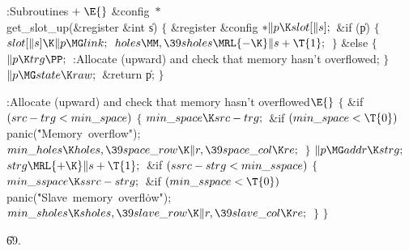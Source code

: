 \Y\B\4:Subroutines\X${}\mathrel+\E{}$\6
\&{config} ${}{*}{}$\\{get\_slot\_up}(\&{register} \&{int} \|s)\1\1\2\2\6
${}\{{}$\1\6
\&{register} \&{config} ${}{*}\|p\K\\{slot}[\|s];{}$\7
\&{if} (\|p)\5
${}\{{}$\1\6
${}\\{slot}[\|s]\K\|p\MG\\{link};{}$\6
${}\\{holes}\MM,\39\\{sholes}\MRL{-{\K}}\|s+\T{1};{}$\6
\4${}\}{}$\5
\2\&{else}\5
${}\{{}$\1\6
${}\|p\K\\{trg}\PP;{}$\6
:Allocate  (upward) and check that memory hasn't
overflowed\X;\6
\4${}\}{}$\2\6
${}\|p\MG\\{state}\K\\{raw};{}$\6
\&{return} \|p;\6
\4${}\}{}$\2\par
\fi

\B{}:Allocate  (upward) and check
that memory hasn't overflowed\X${}\E{}$\6
${}\{{}$\1\6
\&{if} ${}(\\{src}-\\{trg}<\\{min\_space}){}$\5
${}\{{}$\1\6
${}\\{min\_space}\K\\{src}-\\{trg};{}$\6
\&{if} ${}(\\{min\_space}<\T{0}){}$\1\5
\\{panic}(\.{"Memory\ overflow"});\2\6
${}\\{min\_holes}\K\\{holes},\39\\{space\_row}\K\|r,\39\\{space\_col}\K%
\\{re};{}$\6
\4${}\}{}$\2\6
${}\|p\MG\\{addr}\K\\{strg};{}$\6
${}\\{strg}\MRL{+{\K}}\|s+\T{1};{}$\6
\&{if} ${}(\\{ssrc}-\\{strg}<\\{min\_sspace}){}$\5
${}\{{}$\1\6
${}\\{min\_sspace}\K\\{ssrc}-\\{strg};{}$\6
\&{if} ${}(\\{min\_sspace}<\T{0}){}$\1\5
\\{panic}(\.{"Slave\ memory\ overfl}\)\.{ow"});\2\6
${}\\{min\_sholes}\K\\{sholes},\39\\{slave\_row}\K\|r,\39\\{slave\_col}\K%
\\{re};{}$\6
\4${}\}{}$\2\6
\4${}\}{}$\2\par
\U69.\fi

